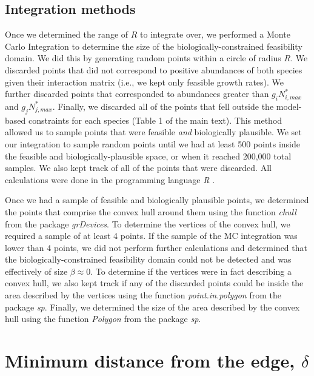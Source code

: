 \begin{refsection}
\subsection*{Integration methods}

Once we determined the range of $R$ to integrate over, we performed a Monte Carlo Integration to determine the size of the biologically-constrained feasibility domain. We did this by generating random points within a circle of radius $R$. We discarded points that did not correspond to positive abundances of both species given their interaction matrix (i.e., we kept only feasible growth rates). We further discarded points that corresponded to abundances greater than $g_{i}N_{i,max}^{*}$ and $g_{j}N_{j,max}^{*}$. Finally, we discarded all of the points that fell outside the model-based constraints for each species (Table 1 of the main text). This method allowed us to sample points that were feasible \textit{and} biologically plausible. We set our integration to sample random points until we had at least 500 points inside the feasible and biologically-plausible space, or when it reached 200,000 total samples. We also kept track of all of the points that were discarded. All calculations were done in the programming language \textit{R} \citep{Rcore}.


Once we had a sample of feasible and biologically plausible points, we determined the points that comprise the convex hull around them using the function \textit{chull} from the package \textit{grDevices}. To determine the vertices of the convex hull, we required a sample of at least 4 points. If the sample of the MC integration was lower than 4 points, we did not perform further calculations and determined that the biologically-constrained feasibility domain could not be detected and was effectively of size $\beta \approx 0$. To determine if the vertices were in fact describing a convex hull, we also kept track if any of the discarded points could be inside the area described by the vertices using the function \textit{point.in.polygon} from the package \textit{sp}. Finally, we determined the size of the area described by the convex hull using the function \textit{Polygon} from the package \textit{sp}.



\section*{Minimum distance from the edge, $\delta$}


\end{refsection}
